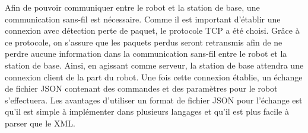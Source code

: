Afin de pouvoir communiquer entre le robot et la station de base, une communication sans-fil est nécessaire. Comme il est important d’établir une connexion avec détection perte de paquet, le protocole TCP a été choisi. Grâce à ce protocole, on s’assure que les paquets perdus seront retransmis afin de ne perdre aucune information dans la communication sans-fil entre le robot et la station de base. Ainsi, en agissant comme serveur, la station de base attendra une connexion client de la part du robot. Une fois cette connexion établie, un échange de fichier JSON contenant des commandes et des paramètres pour le robot s’effectuera. Les avantages d’utiliser un format de fichier JSON pour l’échange est qu’il est simple à implémenter dans plusieurs langages et qu’il est plus facile à parser que le XML.